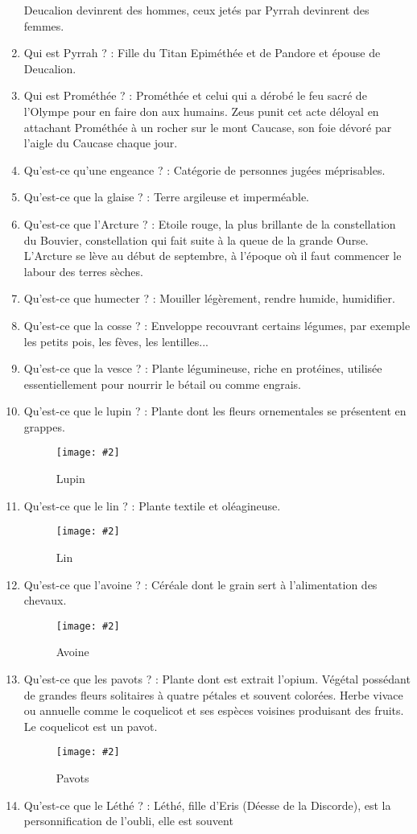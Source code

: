 \documentclass[a4paper, 11pt, hidelinks]{article}
\newcommand{\img}[4]{\begin{figure}[!ht]
    \centering
    \texttt{[image: \#2]}
    \caption{#3}
    \label{#4}
    \end{figure} }
\begin{document}
\begin{enumerate}
            Deucalion devinrent des hommes, ceux jetés par Pyrrah devinrent des femmes.
      \item Qui est Pyrrah ? : Fille du Titan Epiméthée et de Pandore et épouse de Deucalion.
      \item Qui est Prométhée ? : Prométhée et celui qui a dérobé le feu sacré de l'Olympe pour en faire don aux humains. Zeus punit cet
            acte déloyal en attachant Prométhée à un rocher sur le mont Caucase, son foie dévoré par l'aigle du Caucase chaque jour.
      \item Qu'est-ce qu'une engeance ? : Catégorie de personnes jugées méprisables.
      \item Qu'est-ce que la glaise ? : Terre argileuse et imperméable.
      \item Qu'est-ce que l'Arcture ? : Etoile rouge, la plus brillante de la constellation du Bouvier, constellation qui fait suite à la queue de
            la grande Ourse. L'Arcture se lève au début de septembre, à l'époque où il faut commencer le labour des terres sèches.
      \item Qu'est-ce que humecter ? : Mouiller légèrement, rendre humide, humidifier.
      \item Qu'est-ce que la cosse ? : Enveloppe recouvrant certains légumes, par exemple les petits pois, les fèves, les lentilles...
      \item Qu'est-ce que la vesce ? : Plante légumineuse, riche en protéines, utilisée essentiellement pour nourrir le bétail ou comme engrais.
      \item Qu'est-ce que le lupin ? : Plante dont les fleurs ornementales se présentent en grappes.
            \img{0.2}{Lupin.jpg}{Lupin}{16}
      \item Qu'est-ce que le lin ? : Plante textile et oléagineuse.
            \img{0.2}{Lin.jpg}{Lin}{17}
      \item Qu'est-ce que l'avoine ? : Céréale dont le grain sert à l'alimentation des chevaux.
            \img{0.2}{Avoine.jpg}{Avoine}{18}
            \newpage
      \item Qu'est-ce que les pavots ? : Plante dont est extrait l'opium. Végétal possédant de grandes fleurs solitaires à quatre pétales et
            souvent colorées. Herbe vivace ou annuelle comme le coquelicot et ses espèces voisines produisant des fruits. Le coquelicot est un pavot.
            \img{0.5}{Pavot.jpg}{Pavots}{19}
      \item Qu'est-ce que le Léthé ? : Léthé, fille d'Eris (Déesse de la Discorde), est la personnification de l'oubli, elle est souvent

\end{enumerate}
\end{document}
